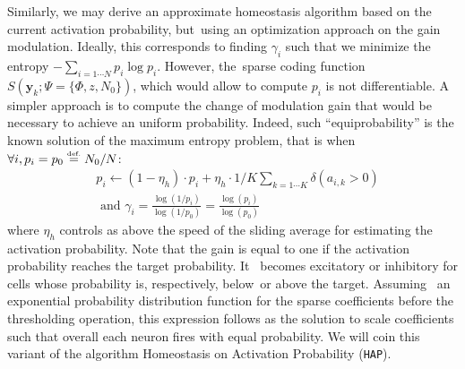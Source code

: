 \documentclass[vision,article,accept,oneauthor,pdftex]{Definitions/mdpi}
\newcommand{\image}{\mathbf{y}} %
\newcommand{\dico}{\Phi} %
\newcommand{\eqdef}{\ensuremath{\stackrel{\mbox{\upshape\tiny def.}}{=}}}
\begin{document}
Similarly, we may derive an approximate homeostasis algorithm based on the current activation probability, but~using an optimization approach on the gain modulation. Ideally, this corresponds to finding $\gamma_i$ such that we minimize the entropy $-\sum_{i=1\cdots N} p_i \log p_i$. However, the~sparse coding function $S(\image_k; \Psi=\{\dico, z, N_0\})$, which would allow to compute $p_i$ is not differentiable. %
A simpler approach is to compute the change of modulation gain that would be necessary to achieve an uniform probability. Indeed, such ``equiprobability'' is the known solution of the maximum entropy problem, that is when $\forall i, p_i = p_0 \eqdef N_0 / N$: %
\begin{align}%
&p_i \leftarrow (1- \eta_h ) \cdot p_i + \eta_h \cdot 1/K\sum_{k=1\cdots K} \delta(a_{i, k} > 0) \\ &\textrm{ and }
\gamma_i = \frac{\log(1/p_i)}{\log(1/p_0)} = \frac{\log(p_i)}{\log(p_0)}
\end{align}%
where $\eta_h$ controls as above the speed of the sliding average for estimating the activation probability. Note that the gain is equal to one if the activation probability reaches the target probability. It~ becomes excitatory or inhibitory for cells whose probability is, respectively, below~or above the target. Assuming~ an exponential probability distribution function for the sparse coefficients before the thresholding operation, this expression follows as the solution to scale coefficients such that overall each neuron fires with equal probability. We will coin this variant of the algorithm Homeostasis on Activation Probability (\texttt{HAP}).
\end{document}
